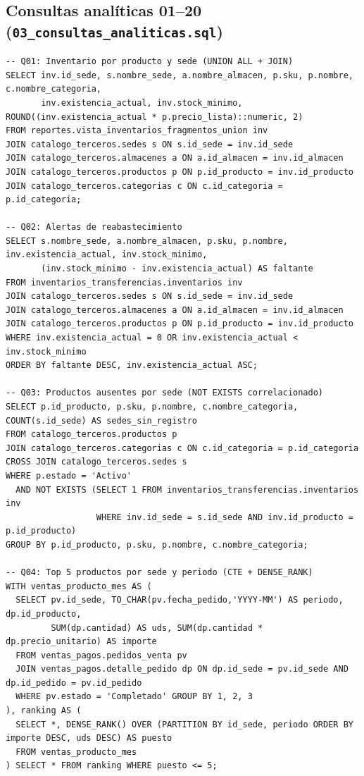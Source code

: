 \documentclass[11pt,oneside]{article}
\begin{document}
\subsection{Consultas anal\'iticas 01--20 (\texttt{03\_consultas\_analiticas.sql})}
\begin{lstlisting}
-- Q01: Inventario por producto y sede (UNION ALL + JOIN)
SELECT inv.id_sede, s.nombre_sede, a.nombre_almacen, p.sku, p.nombre, c.nombre_categoria,
       inv.existencia_actual, inv.stock_minimo, ROUND((inv.existencia_actual * p.precio_lista)::numeric, 2)
FROM reportes.vista_inventarios_fragmentos_union inv
JOIN catalogo_terceros.sedes s ON s.id_sede = inv.id_sede
JOIN catalogo_terceros.almacenes a ON a.id_almacen = inv.id_almacen
JOIN catalogo_terceros.productos p ON p.id_producto = inv.id_producto
JOIN catalogo_terceros.categorias c ON c.id_categoria = p.id_categoria;

-- Q02: Alertas de reabastecimiento
SELECT s.nombre_sede, a.nombre_almacen, p.sku, p.nombre, inv.existencia_actual, inv.stock_minimo,
       (inv.stock_minimo - inv.existencia_actual) AS faltante
FROM inventarios_transferencias.inventarios inv
JOIN catalogo_terceros.sedes s ON s.id_sede = inv.id_sede
JOIN catalogo_terceros.almacenes a ON a.id_almacen = inv.id_almacen
JOIN catalogo_terceros.productos p ON p.id_producto = inv.id_producto
WHERE inv.existencia_actual = 0 OR inv.existencia_actual < inv.stock_minimo
ORDER BY faltante DESC, inv.existencia_actual ASC;

-- Q03: Productos ausentes por sede (NOT EXISTS correlacionado)
SELECT p.id_producto, p.sku, p.nombre, c.nombre_categoria, COUNT(s.id_sede) AS sedes_sin_registro
FROM catalogo_terceros.productos p
JOIN catalogo_terceros.categorias c ON c.id_categoria = p.id_categoria
CROSS JOIN catalogo_terceros.sedes s
WHERE p.estado = 'Activo'
  AND NOT EXISTS (SELECT 1 FROM inventarios_transferencias.inventarios inv
                  WHERE inv.id_sede = s.id_sede AND inv.id_producto = p.id_producto)
GROUP BY p.id_producto, p.sku, p.nombre, c.nombre_categoria;

-- Q04: Top 5 productos por sede y periodo (CTE + DENSE_RANK)
WITH ventas_producto_mes AS (
  SELECT pv.id_sede, TO_CHAR(pv.fecha_pedido,'YYYY-MM') AS periodo, dp.id_producto,
         SUM(dp.cantidad) AS uds, SUM(dp.cantidad * dp.precio_unitario) AS importe
  FROM ventas_pagos.pedidos_venta pv
  JOIN ventas_pagos.detalle_pedido dp ON dp.id_sede = pv.id_sede AND dp.id_pedido = pv.id_pedido
  WHERE pv.estado = 'Completado' GROUP BY 1, 2, 3
), ranking AS (
  SELECT *, DENSE_RANK() OVER (PARTITION BY id_sede, periodo ORDER BY importe DESC, uds DESC) AS puesto
  FROM ventas_producto_mes
) SELECT * FROM ranking WHERE puesto <= 5;


\end{lstlisting}
\end{document}
